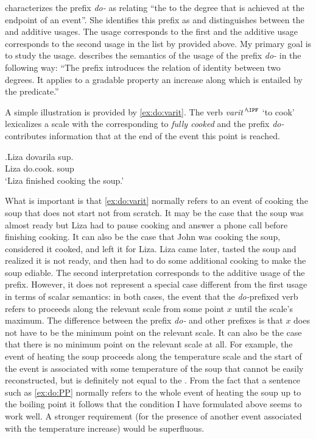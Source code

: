 \citet[70]{Kagan:book} characterizes the prefix \textit{do-} as relating ``the  to the degree that is achieved at the endpoint of an event''. She identifies this prefix as  and distinguishes between the  and additive  usages. The  usage corresponds to the first and the additive usage corresponds to the second usage in the list by \citet{Shvedova:82} provided above. My primary goal is to study the  usage. \citet[72]{Kagan:book} describes the semantics of the  usage of the prefix \textit{do-} in the following way: ``The prefix introduces the relation of identity between two degrees. It applies to a gradable property an increase along which is entailed by the predicate.''

A simple illustration is provided by \ref{ex:do:varit}. The verb \textit{varit'}$^{\IPF}$ `to cook' lexicalizes a scale with the  corresponding to \textit{fully cooked} and the prefix \textit{do-} contributes information that at the end of the event this point is reached. 

\exg.\label{ex:do:varit}Liza dovarila sup.\\
Liza do.cook. soup\\
\trans `Liza finished cooking the soup.'

What is important is that \ref{ex:do:varit} normally refers to an event of cooking the soup that does not start not from scratch. It may be the case that the soup was almost ready but Liza had to pause cooking and answer a phone call before finishing cooking. It can also be the case that John was cooking the soup, considered it cooked, and left it for Liza. Liza came later, tasted the soup and realized it is not ready, and then had to do some additional cooking to make the soup ediable. The second interpretation corresponds to the additive usage of the prefix. However, it does not represent a special case different from the first usage in terms of scalar semantics: in both cases, the event that the \textit{do-}prefixed verb refers to proceeds along the relevant scale from some point $x$ until the scale's maximum. The difference between the prefix \textit{do-} and other prefixes is that $x$ does not have to be the minimum point on the relevant scale. It can also be the case that there is no minimum point on the relevant scale at all. For example, the event of heating the soup proceeds along the temperature scale and the start of the event is associated with some temperature of the soup that cannot be easily reconstructed, but is definitely not equal to the . From the fact that a sentence such as \ref{ex:do:PP} normally refers to the whole event of heating the soup up to the boiling point it follows that the condition I have formulated above seems to work well. A stronger requirement (for the presence of another event associated with the temperature increase) would be superfluous.

